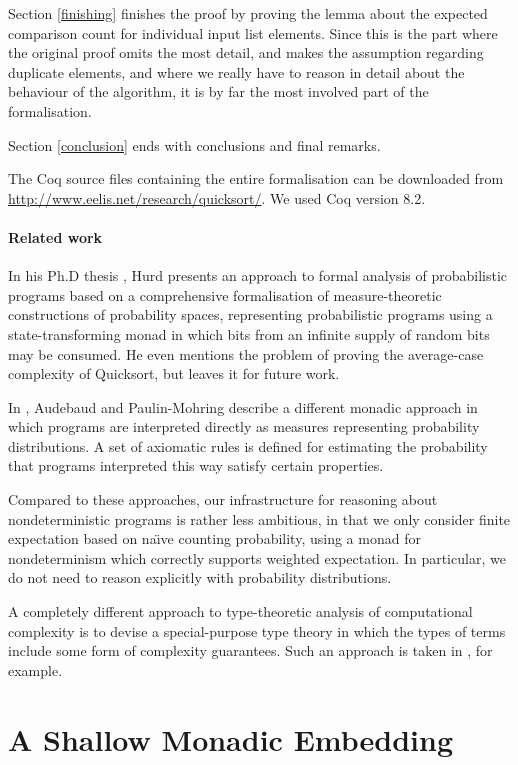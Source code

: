 \documentclass[runningheads]{llncs}
\begin{document}
Section \ref{finishing} finishes the proof by proving the lemma about the expected comparison count for individual input list elements. Since this is the part where the original proof omits the most detail, and makes the assumption regarding duplicate elements, and where we really have to reason in detail about the behaviour of the algorithm, it is by far the most involved part of the formalisation.

Section \ref{conclusion} ends with conclusions and final remarks.

The Coq source files containing the entire formalisation can be downloaded from \url{http://www.eelis.net/research/quicksort/}. We used Coq version 8.2.

\paragraph{Related work}

In his Ph.D thesis \cite{hurd}, Hurd presents an approach to formal analysis
of probabilistic programs based on a comprehensive formalisation of
measure-theoretic constructions of probability spaces, representing
probabilistic programs using a state-transforming monad in which bits from an
infinite supply of random bits may be consumed. He even mentions the problem
of proving the average-case complexity of Quicksort, but leaves it for future work.

In \cite{mohringaudebaud}, Audebaud and Paulin-Mohring describe a different monadic approach in which programs are interpreted directly as measures representing probability distributions. A set of axiomatic rules is defined for estimating the probability that programs interpreted this way satisfy certain properties.

Compared to these approaches, our infrastructure for reasoning about nondeterministic programs is rather less ambitious, in that we only consider finite expectation based on na{\"\i}ve counting probability, using a monad for nondeterminism which correctly supports weighted expectation. In particular, we do not need to reason explicitly with probability distributions.

A completely different approach to type-theoretic analysis of computational complexity is to devise a special-purpose type theory in which the types of terms include some form of complexity guarantees. Such an approach is taken in \cite{constable}, for example.

\section{A Shallow Monadic Embedding}
\label{embed}
\end{document}
